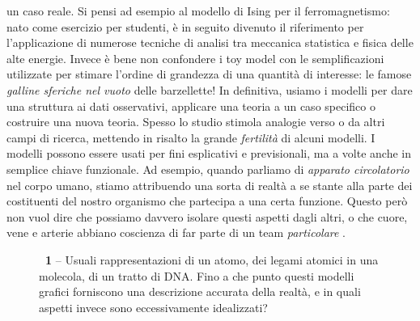 un caso reale. Si pensi ad esempio al modello di Ising per il ferromagnetismo: nato come
esercizio per studenti, è in seguito divenuto
il riferimento per l'applicazione di numerose tecniche di analisi tra meccanica statistica e
fisica delle alte energie. Invece è bene non confondere i toy model con le semplificazioni utilizzate
per stimare l'ordine di grandezza di una quantità di interesse: le famose \emph{galline sferiche nel vuoto}
delle barzellette!
In definitiva, usiamo i modelli per dare una struttura ai dati osservativi, applicare una teoria 
a un caso specifico o costruire una nuova teoria. Spesso lo studio stimola analogie verso o da 
altri campi di ricerca, mettendo in risalto la grande \textsl{fertilità} di alcuni modelli.
I modelli possono essere usati per fini esplicativi e previsionali, ma a volte anche in semplice
chiave funzionale. Ad esempio, quando parliamo di \emph{apparato circolatorio} nel corpo umano, stiamo
attribuendo una sorta di realtà a se stante alla parte dei costituenti del nostro organismo che
partecipa a una certa funzione. Questo però non vuol dire che possiamo davvero isolare questi aspetti dagli altri, o che cuore, vene e arterie abbiano coscienza di far parte di
un team \emph{particolare} \cite{hczhc}.

\begin{figure}[!t]
\begin{center}
\caption{\textbf{\figurename~1} -- Usuali rappresentazioni di un atomo, dei legami atomici in una molecola, di un
tratto di DNA. Fino a che punto questi modelli grafici forniscono una descrizione accurata
della realtà, e in quali aspetti invece sono eccessivamente idealizzati?}
\label{fig:chall_oring_fail}
\end{center}
\vskip-20pt
\end{figure}

